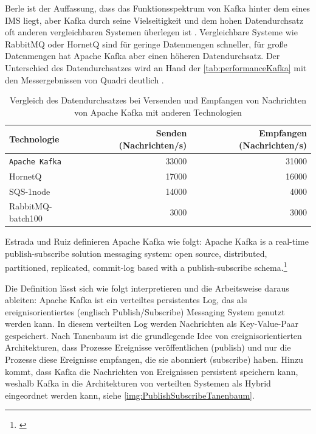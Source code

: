 \documentclass[a4paper,titlepage,halfparskip,12pt]{scrreprt}
\begin{document}
\begin{onehalfspacing}
Berle ist der Auffassung, dass das Funktionsspektrum von Kafka hinter dem eines \ac{IMS} liegt, aber Kafka durch seine Vielseitigkeit und dem hohen Datendurchsatz oft anderen vergleichbaren Systemen überlegen ist \cite{berleKafkaOverview}. Vergleichbare Systeme wie RabbitMQ oder HornetQ sind für geringe Datenmengen schneller, für große Datenmengen hat Apache Kafka aber einen höheren Datendurchsatz. Der Unterschied des Datendurchsatzes wird an Hand der \autoref{tab:performanceKafka} mit den Messergebnissen von Quadri deutlich \cite{quardriKafkaPerformance}.

\begin{table}[h]
\centering
\caption{Vergleich des Datendurchsatzes bei Versenden und Empfangen von Nachrichten von Apache Kafka mit anderen Technologien}
\begin{tabular}{|l|r|r|}
\hline
\textbf{Technologie} & \textbf{Senden (Nachrichten/s)} & \textbf{Empfangen (Nachrichten/s)} \\
\hline
\texttt{Apache Kafka} & 33000 & 31000 \\
\hline
HornetQ & 17000 & 16000 \\
\hline
SQS-1node & 14000 & 4000\\
\hline
RabbitMQ-batch100 & 3000 & 3000 \\
\hline
\end{tabular}
\label{tab:performanceKafka}
\end{table}

Estrada und Ruiz definieren Apache Kafka wie folgt:
\glqq Apache Kafka is a real-time publish-subscribe solution messaging system: open source, distributed, partitioned, replicated, commit-log based with a publish-subscribe schema.\grqq\footnote{\cite[S.166]{estradaRuiz2016}}

Die Definition lässt sich wie folgt interpretieren und die Arbeitsweise daraus ableiten:
Apache Kafka ist ein verteiltes persistentes Log, das als ereignisorientiertes (englisch Publish/Subscribe) Messaging System genutzt werden kann. In diesem verteilten Log werden Nachrichten als Key-Value-Paar gespeichert. Nach Tanenbaum \cite{andrew2008verteilte} ist die grundlegende Idee von ereignisorientierten Architekturen, dass Prozesse Ereignisse veröffentlichen (publish) und nur die Prozesse diese Ereignisse empfangen, die sie abonniert (subscribe) haben. Hinzu kommt, dass Kafka die Nachrichten von Ereignissen persistent speichern kann, weshalb Kafka in die Architekturen von verteilten Systemen als Hybrid eingeordnet werden kann, siehe \autoref{img:PublishSubscribeTanenbaum}.


\end{onehalfspacing}
\end{document}
